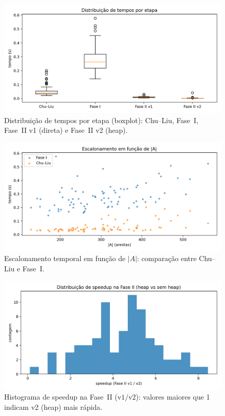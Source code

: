 \documentclass[12pt,a4paper]{article}
\def\emph#1{#1}%
\begin{document}
\begin{figure}[H]
    \centering
    \includegraphics[width=.85\linewidth]{figures/fig_times_boxplot.png}
    \caption{Distribuição de tempos por etapa (boxplot): \emph{Chu--Liu}, Fase~I, Fase~II v1 (direta) e Fase~II v2 (heap).}
    \label{fig:times-boxplot}
\end{figure}

\begin{figure}[H]
    \centering
    \includegraphics[width=.85\linewidth]{figures/fig_time_vs_edges_scatter.png}
    \caption{Escalonamento temporal em função de \(|A|\): comparação entre \emph{Chu--Liu} e Fase~I.}
    \label{fig:time-vs-edges}
\end{figure}

\begin{figure}[H]
    \centering
    \includegraphics[width=.75\linewidth]{figures/fig_speedup_hist.png}
    \caption{Histograma de speedup na Fase~II (\(\text{v1}/\text{v2}\)): valores maiores que 1 indicam v2 (heap) mais rápida.}
    \label{fig:speedup}
\end{figure}
\end{document}
